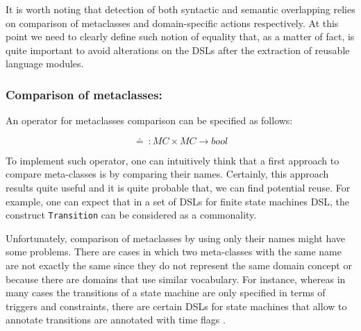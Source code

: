 



It is worth noting that detection of both syntactic and semantic overlapping relies on comparison of metaclasses and domain-specific actions respectively. At this point we need to clearly define such notion of equality that, as a matter of fact, is quite important to avoid alterations on the DSLs after the extraction of reusable language modules.

\vspace{-3mm}
\subsubsection{Comparison of metaclasses:} An operator for metaclasses comparison can be specified as follows: 

\begin{equation}
  \doteq~: MC \times MC \rightarrow bool
\end{equation}

To implement such operator, one can intuitively think that a first approach to compare meta-classes is by comparing their names. Certainly, this approach results quite useful and it is quite probable that, we can find potential reuse. For example, one can expect that in a set of DSLs for finite state machines DSL, the construct \texttt{Transition} can be considered as a commonality.

Unfortunately, comparison of metaclasses by using only their names might have some problems. There are cases in which two meta-classes with the same name are not exactly the same since they do not represent the same domain concept or because there are domains that use similar vocabulary. For instance, whereas in many cases the transitions of a state machine are only specified in terms of triggers and constraints, there are certain DSLs for state machines that allow to annotate transitions are annotated with time flags \cite{Graf:2007}.

